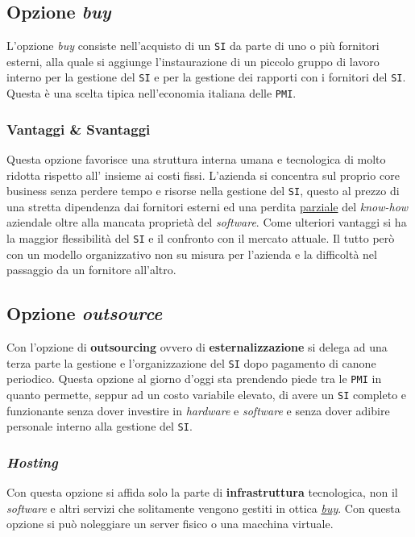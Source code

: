     \subsection{Opzione \textit{buy}}
        \label{sec:opzBuy}
        L'opzione \textit{buy} consiste nell'acquisto di un \texttt{SI} da parte di uno o più fornitori esterni, alla quale si aggiunge l'instaurazione di un piccolo gruppo di lavoro interno per la gestione del \texttt{SI} e per la gestione dei rapporti con i fornitori del \texttt{SI}. Questa è una scelta tipica nell'economia italiana delle \texttt{PMI}.
        \subsubsection{Vantaggi \& Svantaggi}
            Questa opzione favorisce una struttura interna umana e tecnologica di molto ridotta rispetto all' insieme ai costi fissi. L'azienda si concentra sul proprio core business senza perdere tempo e risorse nella gestione del \texttt{SI}, questo al prezzo di una stretta dipendenza dai fornitori esterni ed una perdita \underline{parziale} del \textit{know-how} aziendale oltre alla mancata proprietà del \textit{software}. Come ulteriori vantaggi si ha la maggior flessibilità del \texttt{SI} e il confronto con il mercato attuale. Il tutto però con un modello organizzativo non su misura per l'azienda e la difficoltà nel passaggio da un fornitore all'altro.
    \subsection{Opzione \textit{outsource}}
        Con l'opzione di \textbf{outsourcing} ovvero di \textbf{esternalizzazione} si delega ad una terza parte la gestione e l'organizzazione del \texttt{SI} dopo pagamento di canone periodico.\newline
        Questa opzione al giorno d'oggi sta prendendo piede tra le \texttt{PMI} in quanto permette, seppur ad un costo variabile elevato, di avere un \texttt{SI} completo e funzionante senza dover investire in \textit{hardware} e \textit{software} e senza dover adibire personale interno alla gestione del \texttt{SI}.
        \subsubsection{\textit{Hosting}}
            Con questa opzione si affida solo la parte di \textbf{infrastruttura} tecnologica, non il \textit{software} e altri servizi che solitamente vengono gestiti in ottica \hyperref[sec:opzBuy]{\textit{buy}}. Con questa opzione si può noleggiare un server fisico o una macchina virtuale.
